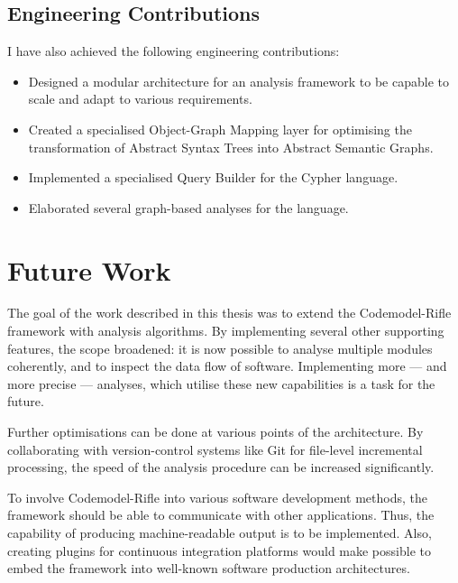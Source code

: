 \subsection{Engineering Contributions}

I have also achieved the following engineering contributions:

\begin{itemize}
\item Designed a modular architecture for an analysis framework to be capable to scale and adapt to various requirements.
\item Created a specialised Object-Graph Mapping layer for optimising the transformation of Abstract Syntax Trees into Abstract Semantic Graphs.
\item Implemented a specialised Query Builder for the Cypher language.
\item Elaborated several graph-based analyses for the \es language.
\end{itemize}


\section{Future Work}

The goal of the work described in this thesis was to extend the Codemodel-Rifle framework with analysis algorithms. By implementing several other supporting features, the scope broadened: it is now possible to analyse multiple modules coherently, and to inspect the data flow of \es software. Implementing more — and more precise — analyses, which utilise these new capabilities is a task for the future.

Further optimisations can be done at various points of the architecture. By collaborating with version-control systems like Git for file-level incremental processing, the speed of the analysis procedure can be increased significantly.

To involve Codemodel-Rifle into various software development methods, the framework should be able to communicate with other applications. Thus, the capability of producing machine-readable output is to be implemented. Also, creating plugins for continuous integration platforms would make possible to embed the framework into well-known software production architectures.